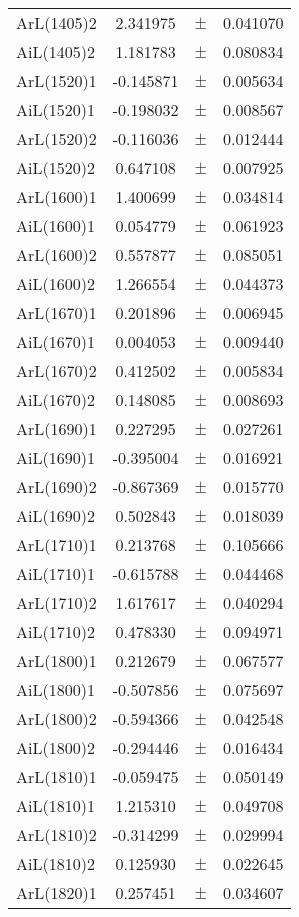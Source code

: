 \begin{table}
\begin{tiny}
\begin{tabular}{lccc}
ArL(1405)2 & 2.341975 & $\pm$ & 0.041070 \\
AiL(1405)2 & 1.181783 & $\pm$ & 0.080834 \\
ArL(1520)1 & -0.145871 & $\pm$ & 0.005634 \\
AiL(1520)1 & -0.198032 & $\pm$ & 0.008567 \\
ArL(1520)2 & -0.116036 & $\pm$ & 0.012444 \\
AiL(1520)2 & 0.647108 & $\pm$ & 0.007925 \\
ArL(1600)1 & 1.400699 & $\pm$ & 0.034814 \\
AiL(1600)1 & 0.054779 & $\pm$ & 0.061923 \\
ArL(1600)2 & 0.557877 & $\pm$ & 0.085051 \\
AiL(1600)2 & 1.266554 & $\pm$ & 0.044373 \\
ArL(1670)1 & 0.201896 & $\pm$ & 0.006945 \\
AiL(1670)1 & 0.004053 & $\pm$ & 0.009440 \\
ArL(1670)2 & 0.412502 & $\pm$ & 0.005834 \\
AiL(1670)2 & 0.148085 & $\pm$ & 0.008693 \\
ArL(1690)1 & 0.227295 & $\pm$ & 0.027261 \\
AiL(1690)1 & -0.395004 & $\pm$ & 0.016921 \\
ArL(1690)2 & -0.867369 & $\pm$ & 0.015770 \\
AiL(1690)2 & 0.502843 & $\pm$ & 0.018039 \\
ArL(1710)1 & 0.213768 & $\pm$ & 0.105666 \\
AiL(1710)1 & -0.615788 & $\pm$ & 0.044468 \\
ArL(1710)2 & 1.617617 & $\pm$ & 0.040294 \\
AiL(1710)2 & 0.478330 & $\pm$ & 0.094971 \\
ArL(1800)1 & 0.212679 & $\pm$ & 0.067577 \\
AiL(1800)1 & -0.507856 & $\pm$ & 0.075697 \\
ArL(1800)2 & -0.594366 & $\pm$ & 0.042548 \\
AiL(1800)2 & -0.294446 & $\pm$ & 0.016434 \\
ArL(1810)1 & -0.059475 & $\pm$ & 0.050149 \\
AiL(1810)1 & 1.215310 & $\pm$ & 0.049708 \\
ArL(1810)2 & -0.314299 & $\pm$ & 0.029994 \\
AiL(1810)2 & 0.125930 & $\pm$ & 0.022645 \\
ArL(1820)1 & 0.257451 & $\pm$ & 0.034607 \\

\end{tabular}
\end{tiny}
\end{table}
